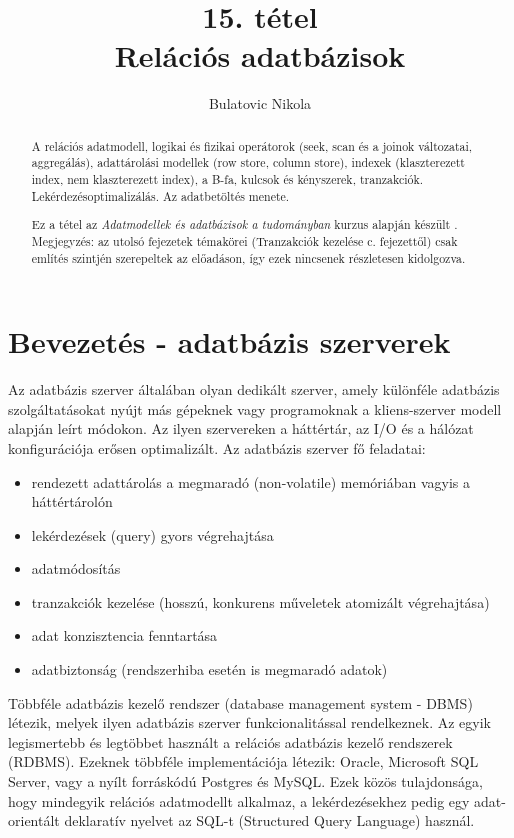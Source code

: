 \documentclass[12pt]{article}
\theoremstyle{plain}
\begin{document}
\title{15. tétel \\ Relációs adatbázisok}
\author{Bulatovic Nikola}

\maketitle


\begin{abstract}
     A relációs adatmodell, logikai és fizikai operátorok (seek, scan és a joinok változatai, aggregálás), adattárolási modellek (row store, column store), indexek (klaszterezett index, nem klaszterezett index), a B-fa, kulcsok és kényszerek, tranzakciók. Lekérdezésoptimalizálás. Az adatbetöltés menete. \par
     Ez a tétel az \textit{Adatmodellek és adatbázisok a tudományban} kurzus alapján készült \cite{db}. Megjegyzés: az utolsó fejezetek témakörei (Tranzakciók kezelése c. fejezettől) csak említés szintjén szerepeltek az előadáson, így ezek nincsenek részletesen kidolgozva.
\end{abstract}

\vfill

\tableofcontents

\newpage

\section{Bevezetés - adatbázis szerverek}

Az adatbázis szerver általában olyan dedikált szerver, amely különféle adatbázis szolgáltatásokat nyújt más gépeknek vagy programoknak a kliens-szerver modell alapján leírt módokon. Az ilyen szervereken a háttértár, az I/O és a hálózat konfigurációja erősen optimalizált. Az adatbázis szerver fő feladatai:
\begin{itemize}
    \item rendezett adattárolás a megmaradó (non-volatile) memóriában vagyis a háttértárolón
    \item lekérdezések (query) gyors végrehajtása
    \item adatmódosítás
    \item tranzakciók kezelése (hosszú, konkurens műveletek atomizált végrehajtása)
    \item adat konzisztencia fenntartása
    \item adatbiztonság (rendszerhiba esetén is megmaradó adatok)
\end{itemize}{}
Többféle adatbázis kezelő rendszer (database management system - DBMS) létezik, melyek ilyen adatbázis szerver funkcionalitással rendelkeznek. Az egyik legismertebb és legtöbbet használt a relációs adatbázis kezelő rendszerek (RDBMS). Ezeknek többféle implementációja létezik: Oracle, Microsoft SQL Server, vagy a nyílt forráskódú Postgres és MySQL. Ezek közös tulajdonsága, hogy mindegyik relációs adatmodellt alkalmaz, a lekérdezésekhez pedig egy adat-orientált deklaratív nyelvet az SQL-t (Structured Query Language) használ. 
\end{document}
